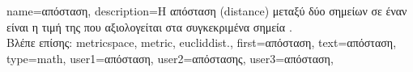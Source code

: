 {name={\foreignlanguage{greek}{απόσταση}},
	description={\foreignlanguage{greek}{Η απόσταση} (distance) \foreignlanguage{greek}{μεταξύ 
		δύο σημείων σε έναν}  \foreignlanguage{greek}{είναι η τιμή της}  
		\foreignlanguage{greek}{που αξιολογείται στα συγκεκριμένα σημεία} \cite{BasicRealAnalysis}.
		\\
		\foreignlanguage{greek}{Βλέπε επίσης:} \gls{metricspace}, \gls{metric}, \gls{eucliddist}.},
	first={\foreignlanguage{greek}{απόσταση}},
	text={\foreignlanguage{greek}{απόσταση}},
	type=math,
	user1={\foreignlanguage{greek}{απόσταση}}, %
  	user2={\foreignlanguage{greek}{απόστασης}}, %
	user3={\foreignlanguage{greek}{απόσταση}}, %
}

